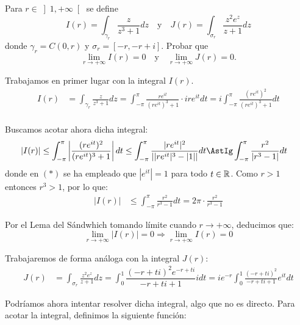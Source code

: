 \begin{ejercicio}
    Para $r \in \left]1,+\infty\right[$ se define
    \[
        I(r) = \int_{\gamma_r} \frac{z}{z^3+1}dz
        \quad \text{y} \quad
        J(r) = \int_{\sigma_r} \frac{z^2 e^z}{z+1}dz
    \]
    donde $\gamma_r = C(0,r)$ y $\sigma_r = [-r,-r+i]$. Probar que
    \[
        \lim_{r\to+\infty} I(r) = 0
        \quad \text{y} \quad
        \lim_{r\to+\infty} J(r) = 0.
    \]

    Trabajamos en primer lugar con la integral $I(r)$.
    \begin{align*}
        I(r) &= \int_{\gamma_r} \frac{z}{z^3+1}dz
        = \int_{-\pi}^{\pi} \frac{re^{it}}{(re^{it})^3+1}\cdot ire^{it}dt
        = i\int_{-\pi}^{\pi} \frac{(re^{it})^2}{(re^{it})^3+1} dt \\
    \end{align*}

    Buscamos acotar ahora dicha integral:
    \begin{align*}
        |I(r)| &\leq \int_{-\pi}^{\pi} \left|\frac{(re^{it})^2}{(re^{it})^3+1}\right|dt
        \leq \int_{-\pi}^{\pi} \frac{|re^{it}|^2}{\left||re^{it}|^3-|1|\right|}dt 
        \AstIg \int_{-\pi}^{\pi} \frac{r^2}{|r^3-1|}dt
    \end{align*}
    donde en $(\ast)$ se ha empleado que $|e^{it}|=1$ para todo $t \in \mathbb{R}$. Como $r>1$ entonces $r^3>1$, por lo que:
    \begin{align*}
        |I(r)| &\leq \int_{-\pi}^{\pi} \frac{r^2}{r^3-1}dt = 2\pi\cdot \frac{r^2}{r^3-1}
    \end{align*}

    Por el Lema del Sándwhich tomando límite cuando $r \to +\infty$, deducimos que:
    \begin{equation*}
        \lim_{r\to+\infty} |I(r)| = 0
        \Longrightarrow \lim_{r\to+\infty} I(r) = 0
    \end{equation*}

    Trabajaremos de forma análoga con la integral $J(r)$:
    \begin{align*}
        J(r) &= \int_{\sigma_r} \frac{z^2 e^z}{z+1}dz
        = \int_{0}^{1} \dfrac{(-r+ti)^2e^{-r+ti}}{-r+ti+1}i dt
        = ie^{-r}\int_{0}^{1} \frac{(-r+ti)^2}{-r+ti+1}e^{it}dt
    \end{align*}

    Podríamos ahora intentar resolver dicha integral, algo que no es directo. Para acotar la integral, definimos la siguiente función:


\end{ejercicio}
